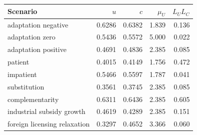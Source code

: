 \begin{tabular}{lrrrr}\toprule
Scenario & $u$ & $c$ & $\mu_U$ & $L_UL_C$ \\\midrule
adaptation negative & 0.6286 & 0.6382 & 1.839 & 0.136 \\
adaptation zero & 0.5436 & 0.5572 & 5.000 & 0.022 \\
adaptation positive & 0.4691 & 0.4836 & 2.385 & 0.085 \\
patient & 0.4015 & 0.4149 & 1.756 & 0.472 \\
impatient & 0.5466 & 0.5597 & 1.787 & 0.041 \\
substitution & 0.3561 & 0.3745 & 2.385 & 0.085 \\
complementarity & 0.6311 & 0.6436 & 2.385 & 0.605 \\
industrial subsidy growth & 0.4619 & 0.4289 & 2.385 & 0.151 \\
foreign licensing relaxation & 0.3297 & 0.4652 & 3.366 & 0.060 \\
\bottomrule\end{tabular}
